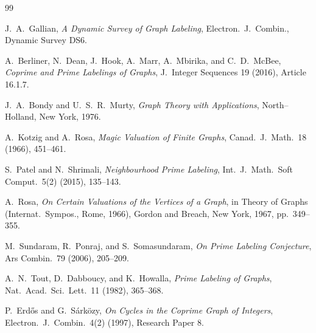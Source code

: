 \documentclass[12pt]{amsart}
\theoremstyle{plain}
\theoremstyle{definition}
\theoremstyle{remark}
\numberwithin{equation}{section}
\begin{document}
\begin{thebibliography}{99}

J.~A.~Gallian, 
\emph{A Dynamic Survey of Graph Labeling}, 
Electron.\ J.\ Combin., Dynamic Survey DS6.

A.~Berliner, N.~Dean, J.~Hook, A.~Marr, A.~Mbirika, and C.~D.~McBee, 
\emph{Coprime and Prime Labelings of Graphs}, 
J.\ Integer Sequences 19 (2016), Article 16.1.7.

J.~A.~Bondy and U.~S.~R.~Murty, 
\emph{Graph Theory with Applications}, 
North--Holland, New York, 1976.

A.~Kotzig and A.~Rosa, 
\emph{Magic Valuation of Finite Graphs}, 
Canad.\ J.\ Math.\ 18 (1966), 451--461.

S.~Patel and N.~Shrimali, 
\emph{Neighbourhood Prime Labeling}, 
Int.\ J.\ Math.\ Soft Comput.\ 5(2) (2015), 135--143.

A.~Rosa, 
\emph{On Certain Valuations of the Vertices of a Graph}, 
in Theory of Graphs (Internat.\ Sympos., Rome, 1966), Gordon and Breach, New York, 1967, pp.~349--355.

M.~Sundaram, R.~Ponraj, and S.~Somasundaram, 
\emph{On Prime Labeling Conjecture}, 
Ars Combin.\ 79 (2006), 205--209.

A.~N.~Tout, D.~Dabboucy, and K.~Howalla, 
\emph{Prime Labeling of Graphs}, 
Nat.\ Acad.\ Sci.\ Lett.\ 11 (1982), 365--368.

P.~Erd\H{o}s and G.~S\'ark\"ozy, 
\emph{On Cycles in the Coprime Graph of Integers}, 
Electron.\ J.\ Combin.\ 4(2) (1997), Research Paper 8.

\end{thebibliography}
\end{document}
